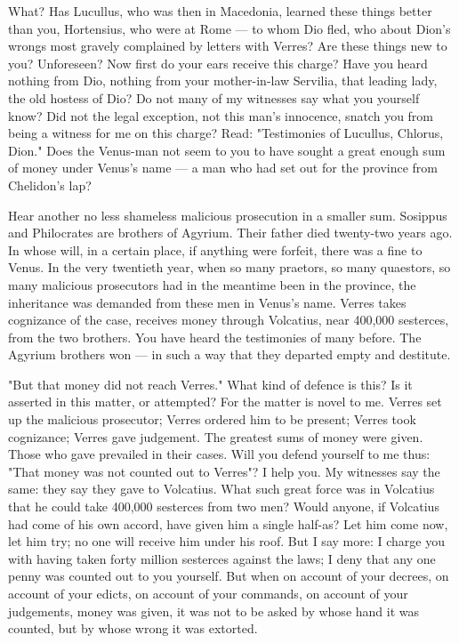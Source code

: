  What? Has Lucullus, who was then in Macedonia, learned these things better than you, Hortensius, who were at Rome --- to whom Dio fled, who about Dion's wrongs most gravely complained by letters with Verres? Are these things new to you? Unforeseen? Now first do your ears receive this charge? Have you heard nothing from Dio, nothing from your mother-in-law Servilia, that leading lady, the old hostess of Dio? Do not many of my witnesses say what you yourself know? Did not the legal exception, not this man's innocence, snatch you from being a witness for me on this charge? Read: "Testimonies of Lucullus, Chlorus, Dion." Does the Venus-man not seem to you to have sought a great enough sum of money under Venus's name --- a man who had set out for the province from Chelidon's lap?

 Hear another no less shameless malicious prosecution in a smaller sum. Sosippus and Philocrates are brothers of Agyrium. Their father died twenty-two years ago. In whose will, in a certain place, if anything were forfeit, there was a fine to Venus. In the very twentieth year, when so many praetors, so many quaestors, so many malicious prosecutors had in the meantime been in the province, the inheritance was demanded from these men in Venus's name. Verres takes cognizance of the case, receives money through Volcatius, near 400,000 sesterces, from the two brothers. You have heard the testimonies of many before. The Agyrium brothers won --- in such a way that they departed empty and destitute.

 "But that money did not reach Verres." What kind of defence is this? Is it asserted in this matter, or attempted? For the matter is novel to me. Verres set up the malicious prosecutor; Verres ordered him to be present; Verres took cognizance; Verres gave judgement. The greatest sums of money were given. Those who gave prevailed in their cases. Will you defend yourself to me thus: "That money was not counted out to Verres"? I help you. My witnesses say the same: they say they gave to Volcatius. What such great force was in Volcatius that he could take 400,000 sesterces from two men? Would anyone, if Volcatius had come of his own accord, have given him a single half-as? Let him come now, let him try; no one will receive him under his roof. But I say more: I charge you with having taken forty million sesterces against the laws; I deny that any one penny was counted out to you yourself. But when on account of your decrees, on account of your edicts, on account of your commands, on account of your judgements, money was given, it was not to be asked by whose hand it was counted, but by whose wrong it was extorted.

